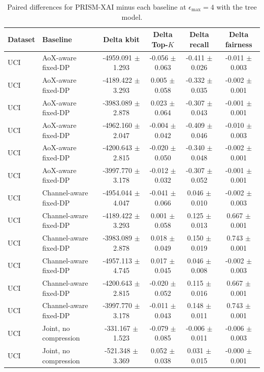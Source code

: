 \begin{table}[t]
\caption{Paired differences for PRISM-XAI minus each baseline at $\epsilon_{\max}=4$ with the tree model.}
\label{tab:paired-differences}
\centering
\scriptsize
\setlength{\tabcolsep}{3pt}
\begin{tabular}{llcccc}
\toprule
Dataset & Baseline & Delta kbit & Delta Top-$K$ & Delta recall & Delta fairness \\
\midrule
UCI & AoX-aware fixed-DP & -4959.091 $\pm$ 1.293 & -0.056 $\pm$ 0.063 & -0.411 $\pm$ 0.026 & -0.011 $\pm$ 0.003 \\
UCI & AoX-aware fixed-DP & -4189.422 $\pm$ 3.293 & 0.005 $\pm$ 0.058 & -0.332 $\pm$ 0.035 & -0.002 $\pm$ 0.001 \\
UCI & AoX-aware fixed-DP & -3983.089 $\pm$ 2.878 & 0.023 $\pm$ 0.064 & -0.307 $\pm$ 0.043 & -0.001 $\pm$ 0.001 \\
UCI & AoX-aware fixed-DP & -4962.160 $\pm$ 2.047 & -0.004 $\pm$ 0.042 & -0.409 $\pm$ 0.046 & -0.010 $\pm$ 0.003 \\
UCI & AoX-aware fixed-DP & -4200.643 $\pm$ 2.815 & -0.020 $\pm$ 0.050 & -0.340 $\pm$ 0.048 & -0.002 $\pm$ 0.001 \\
UCI & AoX-aware fixed-DP & -3997.770 $\pm$ 3.178 & -0.012 $\pm$ 0.032 & -0.307 $\pm$ 0.052 & -0.001 $\pm$ 0.001 \\
UCI & Channel-aware fixed-DP & -4954.044 $\pm$ 4.047 & -0.041 $\pm$ 0.066 & 0.046 $\pm$ 0.010 & -0.002 $\pm$ 0.003 \\
UCI & Channel-aware fixed-DP & -4189.422 $\pm$ 3.293 & 0.001 $\pm$ 0.058 & 0.125 $\pm$ 0.013 & 0.667 $\pm$ 0.001 \\
UCI & Channel-aware fixed-DP & -3983.089 $\pm$ 2.878 & 0.018 $\pm$ 0.049 & 0.150 $\pm$ 0.019 & 0.743 $\pm$ 0.001 \\
UCI & Channel-aware fixed-DP & -4957.113 $\pm$ 4.745 & 0.017 $\pm$ 0.045 & 0.046 $\pm$ 0.008 & -0.002 $\pm$ 0.003 \\
UCI & Channel-aware fixed-DP & -4200.643 $\pm$ 2.815 & -0.020 $\pm$ 0.052 & 0.115 $\pm$ 0.016 & 0.667 $\pm$ 0.001 \\
UCI & Channel-aware fixed-DP & -3997.770 $\pm$ 3.178 & -0.011 $\pm$ 0.043 & 0.148 $\pm$ 0.011 & 0.743 $\pm$ 0.001 \\
UCI & Joint, no compression & -331.167 $\pm$ 1.523 & -0.079 $\pm$ 0.085 & -0.006 $\pm$ 0.011 & -0.006 $\pm$ 0.003 \\
UCI & Joint, no compression & -521.348 $\pm$ 3.369 & 0.052 $\pm$ 0.038 & 0.031 $\pm$ 0.015 & -0.000 $\pm$ 0.001 \\

\end{tabular}
\end{table}
